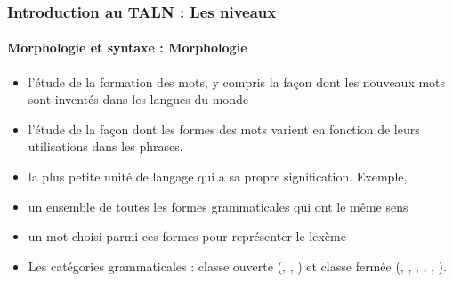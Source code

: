 \documentclass[xcolor=table]{beamer}
\begin{document}
\begin{frame}
\frametitle{Introduction au TALN : Les niveaux}
\framesubtitle{Morphologie et syntaxe : Morphologie}

\begin{itemize}
	\item l'étude de la formation des mots, y compris la façon dont les nouveaux mots sont inventés dans les langues du monde
	\item l'étude de la façon dont les formes des mots varient en fonction de leurs utilisations dans les phrases.
	\item {} la plus petite unité de langage qui a sa propre signification. Exemple, 
	\item {} un ensemble de toutes les formes grammaticales qui ont le même sens
	\item {} un mot choisi parmi ces formes pour représenter le lexème
	\item Les catégories grammaticales : classe ouverte (, , ) et classe fermée (, , , ,  , ).
\end{itemize}

\end{frame}
\end{document}
